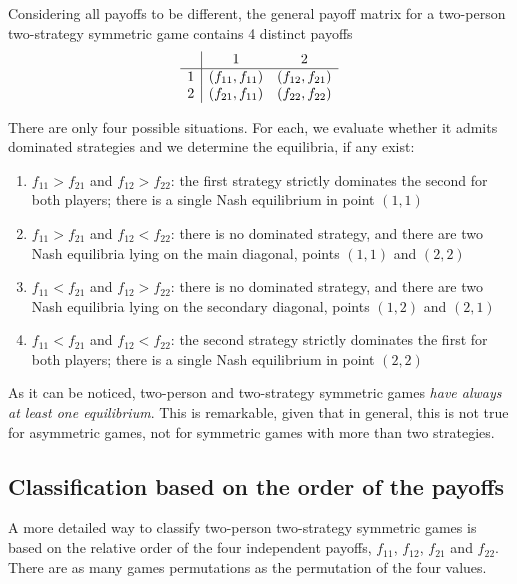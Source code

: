 Considering all payoffs to be different, the general payoff matrix for a two-person two-strategy symmetric game contains 4 distinct payoffs
$$ 
\begin{array}{c | c c}
	& 1 & 2 \\
	\hline
	1 & (f_{11}, f_{11}) & (f_{12}, f_{21}) \\ 
	2 & (f_{21}, f_{11}) &(f_{22}, f_{22}) \\
\end{array}
$$

There are only four possible situations. For each, we evaluate whether it admits dominated strategies and we determine the equilibria, if any exist: 
\begin{enumerate}
	\item $f_{11} > f_{21}$ and $f_{12} > f_{22}$: the first strategy strictly dominates the second for both players; there is a single Nash equilibrium in point $(1,1)$
	
	\item $f_{11} > f_{21}$ and $f_{12} < f_{22}$: there is no dominated strategy, and there are two Nash equilibria lying on the main diagonal, points $(1,1)$ and $(2,2)$
	
	\item $f_{11} < f_{21}$ and $f_{12} > f_{22}$: there is no dominated strategy, and there are two Nash equilibria lying on the secondary diagonal, points $(1,2)$ and $(2,1)$
	
	\item $f_{11} < f_{21}$ and $f_{12} < f_{22}$: the second strategy strictly dominates the first for both players; there is a single Nash equilibrium in point $(2,2)$
\end{enumerate}

As it can be noticed, two-person and two-strategy symmetric games \textit{have always at least one equilibrium}.  This is remarkable, given that in general, this is not true for asymmetric games, not for symmetric games with more than two strategies. 

\subsection{Classification based on the order of the payoffs}

A more detailed way to classify two-person two-strategy symmetric games is based on the relative order of the four independent payoffs, $f_{11}$, $f_{12}$, $f_{21}$ and $f_{22}$. There are as many games permutations as the permutation of the four values.


